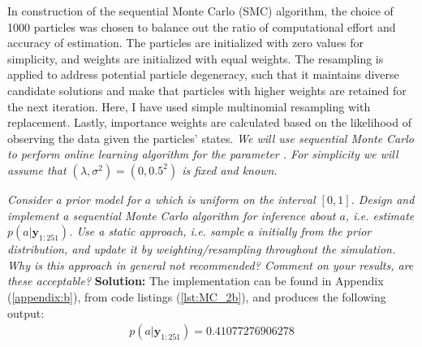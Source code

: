 In construction of the sequential Monte Carlo (SMC) algorithm, the choice of 1000 particles was chosen to balance out the ratio of computational effort and accuracy of estimation. The particles are initialized with zero values for simplicity, and weights are initialized with equal weights. The resampling is applied to address potential particle degeneracy, such that it maintains diverse candidate solutions and make that particles with higher weights are retained for the next iteration. Here, I have used simple multinomial resampling with replacement. Lastly, importance weights are calculated based on the likelihood of observing the data given the particles' states.
\emph{We will use sequential Monte Carlo to perform online learning algorithm for the parameter .
For simplicity we will assume that $(\lambda, \sigma^2) = (0, 0.5^2)$ is fixed and known.} 

\emph{Consider a prior model for $a$ which is uniform on the interval $[0, 1]$. Design and
implement a sequential Monte Carlo algorithm for inference about $a$, i.e.
estimate $p(a | \boldsymbol{y}_{1:251})$. Use a static approach, i.e. sample $a$ initially from the prior distribution, and update it by weighting/resampling throughout the simulation. Why is this approach in general not recommended? Comment on your results, are these
acceptable?}\spaze
\textbf{Solution:} \spaze
The implementation can be found in Appendix (\ref{appendix:b}), from code listings (\ref{lst:MC_2b}), and produces the following output: 
\begin{align*}
     p(a | \boldsymbol{y}_{1:251}) = 0.41077276906278
\end{align*}